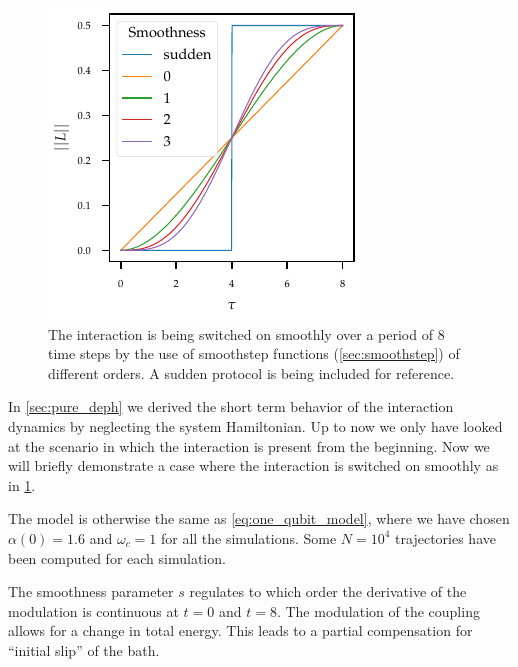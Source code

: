 \begin{figure}
  \centering
  \includegraphics{figs/one_bath_mod/modulation_protocols_init.pdf}
  \caption{\label{fig:L_mod_init} The interaction is being switched on
    smoothly over a period of \(8\) time steps by the use of
    smoothstep functions (\cref{sec:smoothstep}) of different
    orders. A sudden protocol is being included for reference.}
\end{figure}
In \cref{sec:pure_deph} we derived the short term behavior of the
interaction dynamics by neglecting the system Hamiltonian. Up to now
we only have looked at the scenario in which the interaction is
present from the beginning. Now we will briefly demonstrate a case
where the interaction is switched on smoothly as in
\cref{fig:L_mod_init}.

The model is otherwise the same as \cref{eq:one_qubit_model}, where we
have chosen \(α(0)=1.6\) and \(ω_{c}=1\) for all the simulations. Some
\(N=10^{4}\) trajectories have been computed for each simulation.

The smoothness parameter \(s\) regulates to which order the derivative
of the modulation is continuous at \(t=0\) and \(t=8\). The modulation
of the coupling allows for a change in total energy. This leads to a
partial compensation for ``initial slip'' of the bath.

